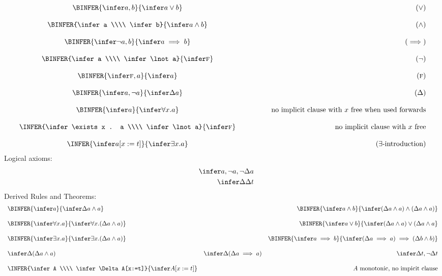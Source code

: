 $$\begin{array}{c@{\quad}l@{\qquad\qquad}r}
  \BINFER{\infer a,b}{\infer a \lor b} && (\lor)
\\
\\\BINFER{\infer a \\\\ \infer b}{\infer a \land b} && (\land)
\\
\\\BINFER{\infer \lnot a,b}{\infer a \implies b} && (\implies)
\\
\\\BINFER{\infer a \\\\ \infer \lnot a}{\infer \F} && (\lnot)
\\
\\\BINFER{\infer \F,a}{\infer a} && (\F)
\\
\\\BINFER{\infer a,\lnot a}{\infer \Delta a} && (\Delta)
\\
\\\BINFER{\infer a}{\infer \forall x.a} && \mbox{no implicit clause with $x$ free when used forwards}
\\
\\\INFER{\infer \exists x . a \\\\ \infer \lnot a}%
        {\infer \F}
        && \mbox{no implicit clause with $x$ free}
\\
\\\INFER{\infer a[x:=t]}{\infer \exists x.a} && (\exists\mbox{-introduction})
\end{array}$$
\newpage
Logical axioms:
\begin{eqnarray*}
  && \infer a,\lnot a,\lnot\Delta a
\\&& \infer \Delta\Delta t
\end{eqnarray*}
Derived Rules and Theorems:
$$\begin{array}{lrr}
   \BINFER%
     {\infer a}%
     {\infer \Delta a \land a}
   &&
   \BINFER%
     {\infer a \land b}%
     {\infer (\Delta a \land a) \land (\Delta a \land a)}
\\ \\
   \BINFER%
     {\infer \forall x.a}%
     {\infer \forall x.(\Delta a \land a)}
   &&
   \BINFER%
     {\infer a \lor b}%
     {\infer (\Delta a \land a) \lor (\Delta a \land a}
\\ \\
   \BINFER%
     {\infer \exists x.a}%
     {\infer \exists x.(\Delta a \land a)}
   &&
   \BINFER%
     {\infer a \implies b}%
     {\infer (\Delta a \implies a) \implies (\Delta b \land b)}
\\ \\
   \infer \Delta(\Delta a \land a)
   &
   \infer \Delta(\Delta a \implies a)
   &
   \infer \Delta t, \lnot \Delta t
\\ \\
   \INFER%
     {\infer A \\\\ \infer \Delta A[x:=t]}%
     {\infer A[x:=t]}
   && A \mbox{ monotonic, no impicit clause}
\end{array}$$

